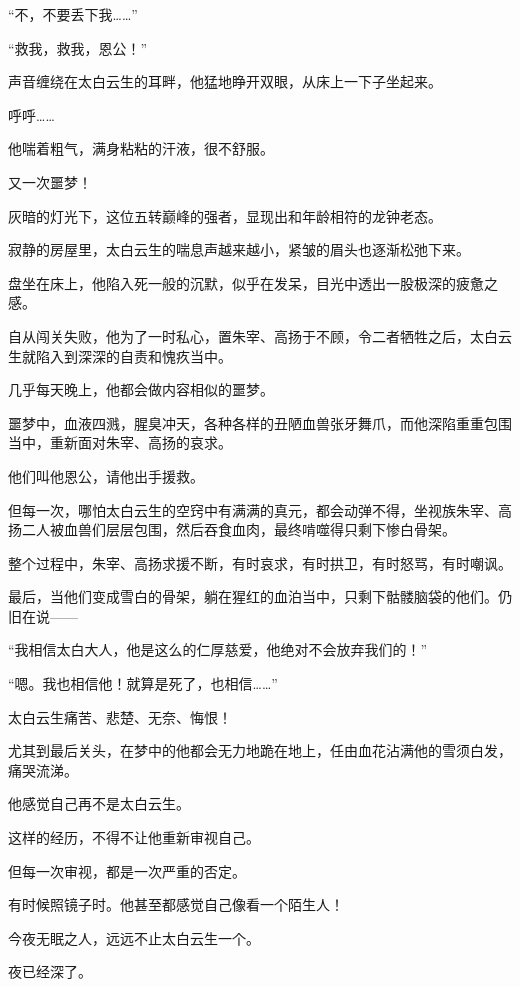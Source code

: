 
\begin{this_body}

“不，不要丢下我……”

“救我，救我，恩公！”

声音缠绕在太白云生的耳畔，他猛地睁开双眼，从床上一下子坐起来。

呼呼……

他喘着粗气，满身粘粘的汗液，很不舒服。

又一次噩梦！

灰暗的灯光下，这位五转巅峰的强者，显现出和年龄相符的龙钟老态。

寂静的房屋里，太白云生的喘息声越来越小，紧皱的眉头也逐渐松弛下来。

盘坐在床上，他陷入死一般的沉默，似乎在发呆，目光中透出一股极深的疲惫之感。

自从闯关失败，他为了一时私心，置朱宰、高扬于不顾，令二者牺牲之后，太白云生就陷入到深深的自责和愧疚当中。

几乎每天晚上，他都会做内容相似的噩梦。

噩梦中，血液四溅，腥臭冲天，各种各样的丑陋血兽张牙舞爪，而他深陷重重包围当中，重新面对朱宰、高扬的哀求。

他们叫他恩公，请他出手援救。

但每一次，哪怕太白云生的空窍中有满满的真元，都会动弹不得，坐视族朱宰、高扬二人被血兽们层层包围，然后吞食血肉，最终啃噬得只剩下惨白骨架。

整个过程中，朱宰、高扬求援不断，有时哀求，有时拱卫，有时怒骂，有时嘲讽。

最后，当他们变成雪白的骨架，躺在猩红的血泊当中，只剩下骷髅脑袋的他们。仍旧在说——

“我相信太白大人，他是这么的仁厚慈爱，他绝对不会放弃我们的！”

“嗯。我也相信他！就算是死了，也相信……”

太白云生痛苦、悲楚、无奈、悔恨！

尤其到最后关头，在梦中的他都会无力地跪在地上，任由血花沾满他的雪须白发，痛哭流涕。

他感觉自己再不是太白云生。

这样的经历，不得不让他重新审视自己。

但每一次审视，都是一次严重的否定。

有时候照镜子时。他甚至都感觉自己像看一个陌生人！

今夜无眠之人，远远不止太白云生一个。

夜已经深了。


\end{this_body}
